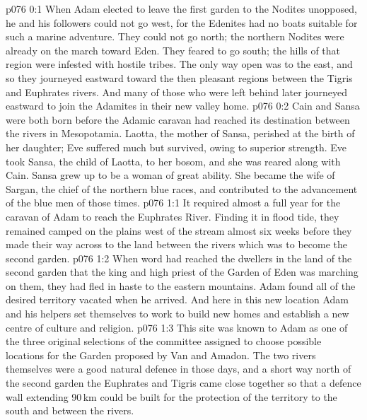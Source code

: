 \author{Solonia}
\vs p076 0:1 When Adam elected to leave the first garden to the Nodites unopposed, he and his followers could not go west, for the Edenites had no boats suitable for such a marine adventure. They could not go north; the northern Nodites were already on the march toward Eden. They feared to go south; the hills of that region were infested with hostile tribes. The only way open was to the east, and so they journeyed eastward toward the then pleasant regions between the Tigris and Euphrates rivers. And many of those who were left behind later journeyed eastward to join the Adamites in their new valley home.
\vs p076 0:2 \pc Cain and Sansa were both born before the Adamic caravan had reached its destination between the rivers in Mesopotamia. Laotta, the mother of Sansa, perished at the birth of her daughter; Eve suffered much but survived, owing to superior strength. Eve took Sansa, the child of Laotta, to her bosom, and she was reared along with Cain. Sansa grew up to be a woman of great ability. She became the wife of Sargan, the chief of the northern blue races, and contributed to the advancement of the blue men of those times.
\vs p076 1:1 It required almost a full year for the caravan of Adam to reach the Euphrates River. Finding it in flood tide, they remained camped on the plains west of the stream almost six weeks before they made their way across to the land between the rivers which was to become the second garden.
\vs p076 1:2 When word had reached the dwellers in the land of the second garden that the king and high priest of the Garden of Eden was marching on them, they had fled in haste to the eastern mountains. Adam found all of the desired territory vacated when he arrived. And here in this new location Adam and his helpers set themselves to work to build new homes and establish a new centre of culture and religion.
\vs p076 1:3 This site was known to Adam as one of the three original selections of the committee assigned to choose possible locations for the Garden proposed by Van and Amadon. The two rivers themselves were a good natural defence in those days, and a short way north of the second garden the Euphrates and Tigris came close together so that a defence wall extending 90\,km could be built for the protection of the territory to the south and between the rivers.
